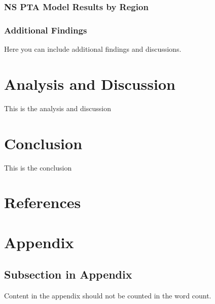 \documentclass{article}%
\begin{document}
\subsubsection{NS PTA Model Results by Region}%
\label{ssubsec:NSPTAModelResultsbyRegion}%
%
%
%
%


%
\newpage%
\subsubsection{Additional Findings}%
\label{ssubsec:AdditionalFindings}%
Here you can include additional findings and discussions.

%
\section{Analysis and Discussion}%
\label{sec:AnalysisandDiscussion}%
This is the analysis and discussion

%
\section{Conclusion}%
\label{sec:Conclusion}%
This is the conclusion

%
\newpage%
\section{References}%
\label{sec:References}%
\printbibliography

%
\newpage%
\section{Appendix}%
\label{sec:Appendix}%
\subsection{Subsection in Appendix}%
\label{subsec:SubsectioninAppendix}%
Content in the appendix should not be counted in the word count.

%
\end{document}
